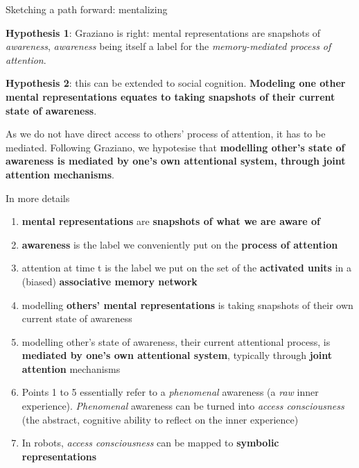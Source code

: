 \documentclass[compress]{beamer}
\begin{document}
\begin{frame}{Sketching a path forward: mentalizing}

    {\bf Hypothesis 1}: Graziano is right: mental representations are snapshots of
    \emph{awareness}, \emph{awareness} being itself a label for the
    \emph{memory-mediated process of attention}.

    \pause

    {\bf Hypothesis 2}: this can be extended to social cognition. \textbf{Modeling one
    other mental representations equates to taking snapshots of their current
    state of awareness}.

    As we do not have direct access to others' process of attention, it has to
    be mediated. Following Graziano, we hypotesise that \textbf{modelling other's
    state of awareness is mediated by one's own attentional system, through
    joint attention mechanisms}.


\end{frame}

{


\begin{frame}{In more details}
\footnotesize
    \begin{enumerate} \item<+-> {\bf mental representations} are {\bf snapshots
                of what we are aware of}

        \item<+-> {\bf awareness} is the label we conveniently put on the {\bf
            process of attention}

        \item<+-> attention at time t is the label we put on the set of the {\bf
            activated units} in a (biased) {\bf associative memory network}

        \item<+-> modelling {\bf others’ mental representations} is taking
            snapshots of their own current state of awareness

        \item<+-> modelling other’s state of awareness, \ie their current
            attentional process, is {\bf mediated by one’s own attentional
            system}, typically through {\bf joint attention} mechanisms

        \item<+-> Points 1 to 5 essentially refer to a \emph{phenomenal}
            awareness (a \emph{raw} inner experience). \emph{Phenomenal}
            awareness can be turned into \emph{access consciousness} (the
            abstract, cognitive ability to reflect on the inner experience)

        \item<+-> In robots, \emph{access consciousness} can be mapped to {\bf
            symbolic representations}

    \end{enumerate}


\end{frame}
}
\end{document}
